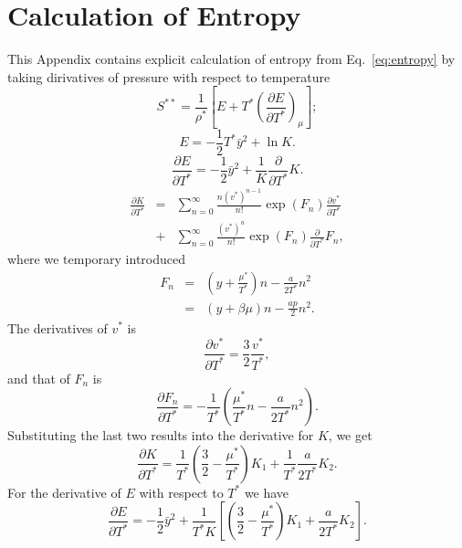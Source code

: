 \documentclass[12pt]{article}
\numberwithin{equation}{section}
\begin{document}
	\section{\label{sec:app:entropy} Calculation of Entropy}
	This Appendix contains explicit calculation of entropy from Eq.~\eqref{eq:entropy} by taking dirivatives of pressure with respect to temperature
	\begin{equation}
		S^{**} = \frac{1}{\rho^*} \left[E + T^* \left(\frac{\partial E}{\partial T^*}\right)_{\mu}\right];
	\end{equation}
	\begin{equation}
		E = -\frac{1}{2}T^* \bar{y}^2 + \ln K.
	\end{equation}
	\begin{equation}
		\frac{\partial E}{\partial T^*} = -\frac{1}{2}\bar{y}^2 + \frac{1}{K}\frac{\partial}{\partial T^*} K.
	\end{equation}
	\begin{eqnarray}
		\frac{\partial K}{\partial T^*} & = & \sum_{n=0}^{\infty} \frac{n (v^*)^{n-1}}{n!} \exp(F_n) \frac{\partial v^*}{\partial T^*} 
		\nonumber\\
		& + & \sum_{n=0}^{\infty} \frac{(v^*)^n}{n!} \exp(F_n) \frac{\partial}{\partial T^*} F_n,
	\end{eqnarray}
	where we temporary introduced
	\begin{eqnarray*}
		F_n & = & \left(y + \frac{\mu^*}{T^*} \right)n -\frac{a}{2T^*}n^2
		\\
		& = & \left(y + \beta\mu \right)n -\frac{ap}{2}n^2.
	\end{eqnarray*}
	The derivatives of $v^*$ is
	\begin{equation}
		\frac{\partial v^*}{\partial T^*} = \frac{3}{2} \frac{v^*}{T^*},
	\end{equation}
	and that of $F_n$ is
	\begin{equation}
		\frac{\partial F_n}{\partial T^*} = -\frac{1}{T^*} \left(\frac{\mu^*}{T^*}n - \frac{a}{2T^*}n^2\right).
	\end{equation}
	Substituting the last two results into the derivative for $K$, we get
	\begin{equation}
		\frac{\partial K}{\partial T^*} = \frac{1}{T^*} \left(\frac{3}{2} - \frac{\mu^*}{T^*} \right)K_1 + \frac{1}{T^*}\frac{a}{2 T^*} K_2.
	\end{equation}
	For the derivative of $E$ with respect to $T^*$ we have
	\begin{equation}
		\frac{\partial E}{\partial T^*} = -\frac{1}{2}\bar{y}^2 + \frac{1}{T^* K} \left[\left(\frac{3}{2} - \frac{\mu^*}{T^*} \right)K_1 + \frac{a}{2 T^*} K_2\right].
	\end{equation}
\end{document}
